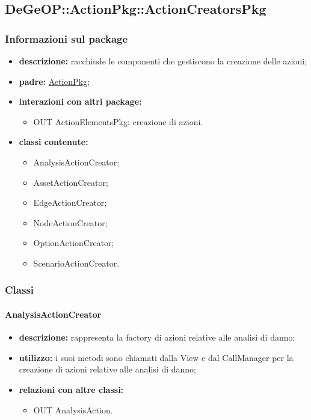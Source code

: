 \subsection{DeGeOP::ActionPkg::ActionCreatorsPkg}
\label{pkg::ActionCreatorsPkg}
\subsubsection{Informazioni sul package}
\begin{itemize}
	\item \textbf{descrizione:} racchiude le componenti che gestiscono la creazione delle azioni;
	\item \textbf{padre:} \hyperref[pkg::ActionPkg]{ActionPkg};
	\item \textbf{interazioni con altri package:} 
	\begin{itemize}
		\item OUT ActionElementsPkg: creazione di azioni.
	\end{itemize}
	\item \textbf{classi contenute:}
	\begin{itemize}
		\item AnalysisActionCreator;
		\item AssetActionCreator;
		\item EdgeActionCreator;
		\item NodeActionCreator;
		\item OptionActionCreator;
		\item ScenarioActionCreator.
	\end{itemize}
\end{itemize}
\subsubsection{Classi}
\paragraph{AnalysisActionCreator}
\begin{itemize}
	\item \textbf{descrizione:} rappresenta la factory di azioni relative alle analisi di danno;
	\item \textbf{utilizzo:} i suoi metodi sono chiamati dalla View e dal CallManager per la creazione di azioni relative alle analisi di danno;
	\item \textbf{relazioni con altre classi:} 
	\begin{itemize}
		\item OUT AnalysisAction.
	\end{itemize}
\end{itemize}
